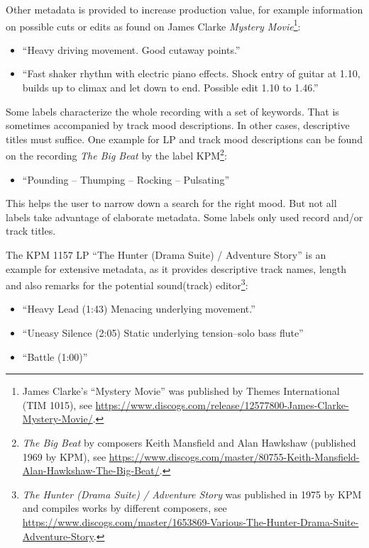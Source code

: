 \documentclass[a4paper,
fontsize=11pt,
oneside,
numbers=noperiodatend,
parskip=half-,
bibliography=totoc,
final
]{scrartcl}
\begin{document}
Other metadata is provided to increase production value, for example
information on possible cuts or edits as found on James Clarke
\emph{Mystery Movie}\footnote{James Clarke's \enquote{Mystery Movie} was
  published by Themes International (TIM 1015), see
  \url{https://www.discogs.com/release/12577800-James-Clarke-Mystery-Movie/}.}:

\begin{itemize}

\item
  \enquote{Heavy driving movement. Good cutaway points.}
\item
  \enquote{Fast shaker rhythm with electric piano effects. Shock entry
  of guitar at 1.10, builds up to climax and let down to end. Possible
  edit 1.10 to 1.46.}
\end{itemize}

Some labels characterize the whole recording with a set of keywords.
That is sometimes accompanied by track mood descriptions. In other
cases, descriptive titles must suffice. One example for LP and track
mood descriptions can be found on the recording \emph{The Big Beat} by
the label KPM\footnote{\emph{The Big Beat} by composers Keith Mansfield
  and Alan Hawkshaw (published 1969 by KPM), see
  \url{https://www.discogs.com/master/80755-Keith-Mansfield-Alan-Hawkshaw-The-Big-Beat/}.}:

\begin{itemize}
\item
  \enquote{Pounding -- Thumping -- Rocking -- Pulsating}
\end{itemize}

This helps the user to narrow down a search for the right mood. But not
all labels take advantage of elaborate metadata. Some labels only used
record and/or track titles.

The KPM 1157 LP \enquote{The Hunter (Drama Suite) / Adventure Story} is
an example for extensive metadata, as it provides descriptive track
names, length and also remarks for the potential sound(track)
editor\footnote{\emph{The Hunter (Drama Suite) / Adventure Story} was
  published in 1975 by KPM and compiles works by different composers,
  see
  \url{https://www.discogs.com/master/1653869-Various-The-Hunter-Drama-Suite-Adventure-Story}.}:

\begin{itemize}

\item
  \enquote{Heavy Lead (1:43) Menacing underlying movement.}
\item
  \enquote{Uneasy Silence (2:05) Static underlying tension--solo bass
  flute}
\item
  \enquote{Battle (1:00)}
\end{itemize}
\end{document}
